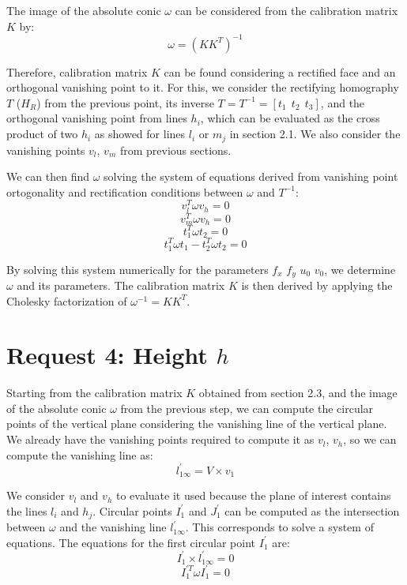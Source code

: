\documentclass{Configuration_Files/PoliMi3i_thesis}
\begin{document}
\noindent
The image of the absolute conic \(\omega\) can be considered from the calibration matrix \(K\) by:
\[
\omega = (KK^{T})^{-1}  
\]

\noindent
Therefore, calibration matrix \(K\) can be found considering a rectified face and an orthogonal vanishing point to it. For this, we consider the rectifying homography \(T\) ($H_R$) from the previous point, its inverse \(T = T^{-1} = \left[ t_{1} ~~ t_{2} ~~ t_{3} \right]\), and the orthogonal vanishing point from lines \(h_{i}\), which can be evaluated as the cross product of two \(h_{i}\) as showed for lines \(l_{i}\) or \(m_{j}\) in section 2.1. We also consider the vanishing points \(v_{l}\), \(v_{m}\) from previous sections.

We can then find \(\omega\) solving the system of equations derived from vanishing point ortogonality and rectification conditions between \(\omega\) and \(T^{-1}\):
\[
v_{l}^{T} \omega v_{h} = 0
\]
\[
v_{m}^{T} \omega v_{h} = 0  
\]
\[
t_{1}^{T} \omega t_{2} = 0  
\]
\[
t_{1}^{T} \omega t_{1} - t_{2}^{T} \omega t_{2} = 0  
\]

\noindent
By solving this system numerically for the parameters \(f_{x}\) \(f_{y}\) \(u_{0}\) \(v_{0}\), we determine \(\omega\) and its parameters. The calibration matrix \(K\) is then derived by applying the Cholesky factorization of \(\omega^{-1} = KK^{T}\).



\newpage
\section{Request 4: Height \(h\)}

\noindent
Starting from the calibration matrix \(K\) obtained from section 2.3, and the image of the absolute conic \(\omega\) from the previous step, we can compute the circular points of the vertical plane considering the vanishing line of the vertical plane.
We already have the vanishing points required to compute it as \(v_{l}\), \(v_{h}\), so we can compute the vanishing line as:
\[
l^{\prime}_{1\infty} = V \times v_{1}  
\]

\noindent
We consider \(v_{l}\) and \(v_{h}\) to evaluate it used because the plane of interest contains the lines \(l_{i}\) and \(h_{j}\). Circular points \(I^{\prime}_{1}\) and \(J^{\prime}_{1}\) can be computed as the intersection between \(\omega\) and the vanishing line \(l^{\prime}_{1\infty}\). This corresponds to solve a system of equations.
The equations for the first circular point \(I^{\prime}_{1}\) are:
\[
I^{\prime}_{1} \times l^{\prime}_{1\infty} = 0  
\]
\[
I^{\prime T}_{1} \omega I^{\prime}_{1} = 0  
\]
\end{document}
